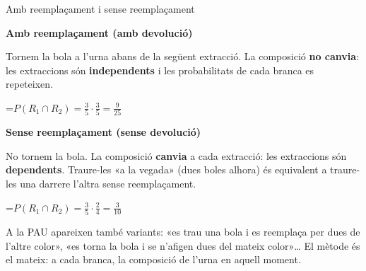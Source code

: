 \documentclass[11pt,a4paper]{article}
\newcommand{\fmm}[1]{\setbox0=\hbox{$#1$}\ifdim\wd0>\linewidth\[#1\]\else\mbox{\box0}\fi}
\begin{document}
  
\begin{fmdef}{Amb reemplaçament i sense reemplaçament}
\par\noindent \begin{minipage}[t]{0.488\linewidth}\vspace{0pt}\begin{tcolorbox}[enhanced,colback=fmsurface,colframe=fmmuted!35,arc=2.5mm,boxrule=0.6pt,left=2.5mm,right=2.5mm,top=1.5mm,bottom=1.5mm,before upper=\raggedright,equal height group=cmp2]{\color{fmnavy}\bfseries Amb reemplaçament (amb devolució)}\par

          

Tornem la bola a l'urna abans de la següent extracció. La composició \textbf{no canvia}: les extraccions són \textbf{independents} i les probabilitats de cada branca es repeteixen.

          

\fmm{P(R_1\cap R_2)=\frac35\cdot\frac35=\frac{9}{25}}\end{tcolorbox}\end{minipage}\hfill\begin{minipage}[t]{0.488\linewidth}\vspace{0pt}\begin{tcolorbox}[enhanced,colback=fmsurface,colframe=fmmuted!35,arc=2.5mm,boxrule=0.6pt,left=2.5mm,right=2.5mm,top=1.5mm,bottom=1.5mm,before upper=\raggedright,equal height group=cmp2]{\color{fmnavy}\bfseries Sense reemplaçament (sense devolució)}\par

          

No tornem la bola. La composició \textbf{canvia} a cada extracció: les extraccions són \textbf{dependents}. Traure-les «a la vegada» (dues boles alhora) és equivalent a traure-les una darrere l'altra sense reemplaçament.

          

\fmm{P(R_1\cap R_2)=\frac35\cdot\frac24=\frac{3}{10}}\end{tcolorbox}\end{minipage}\par\medskip

      
\begin{fmnote}A la PAU apareixen també variants: «es trau una bola i es reemplaça per dues de l'altre color», «es torna la bola i se n'afigen dues del mateix color»\dots{} El mètode és el mateix: a cada branca, la composició de l'urna en aquell moment.\end{fmnote}
\end{fmdef}
\end{document}
